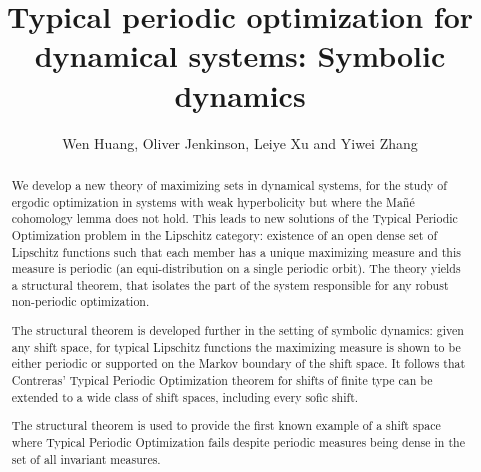 \documentclass[reqno,11pt]{amsart}
\theoremstyle{definition}
\theoremstyle{remark}
\theoremstyle{remark}
\numberwithin{equation}{section}
\begin{document}
\title[Typical periodic optimization]{Typical periodic optimization for dynamical systems: Symbolic dynamics}



\author[W. Huang, O. Jenkinson, L. Xu and Y. Zhang]{Wen Huang, Oliver Jenkinson, Leiye Xu and Yiwei Zhang}




\address[W. Huang]{School of Mathematical Sciences, University of Science and
	Technology of China, Hefei, Anhui 230026, P.R. China}


\address[O.~Jenkinson]{School of Mathematical Sciences, Queen Mary University of London, Mile End Road,
London, E1 4NS, UK}

\address[L. Xu]{School of Mathematical Sciences, University of Science and
	Technology of China, Hefei, Anhui 230026, P.R. China}

\address[Y.~Zhang]{School of Mathematical Sciences and Big Data, Anhui University of Science and Technology, Huainan, Anhui 232001, P.R. China}








\begin{abstract}
We develop a new theory of maximizing sets in dynamical systems, for the study of ergodic optimization in systems with weak
 hyperbolicity but where the Ma\~n\'e cohomology lemma does not hold.
This leads to new solutions of the Typical Periodic Optimization problem in the Lipschitz category:
existence of an open dense 
set of Lipschitz functions such that each member 
has a unique maximizing measure and this measure is periodic (an equi-distribution on a single periodic orbit).
The theory yields a structural theorem, 
that isolates the part of the system responsible for any robust non-periodic optimization.

The structural
theorem is developed further in the setting of symbolic dynamics: given any shift space, for typical Lipschitz functions the maximizing measure is shown to be either periodic or supported on the Markov boundary of the shift space.
It follows that Contreras' Typical Periodic Optimization theorem \cite{C02}
for shifts of finite type can be extended to a wide class of shift spaces, 
including every sofic shift.

The structural theorem is used to provide the first known example of a shift space 
where   Typical Periodic Optimization fails despite periodic measures being 
dense in the set of all invariant measures.
\end{abstract}
\end{document}
